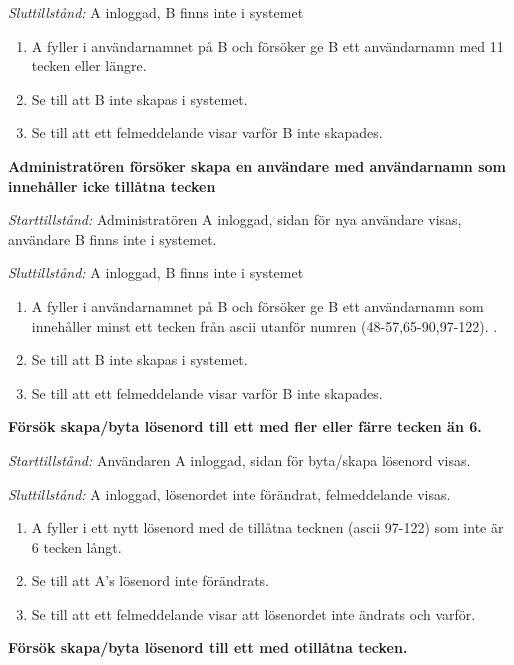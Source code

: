 \documentclass[a4paper]{article}
\begin{document}
\begin{FT}
\emph{Sluttillstånd:} A inloggad, B finns inte i systemet

\begin{enumerate}
\item A fyller i användarnamnet på B och försöker ge B ett användarnamn med 11 tecken eller längre.
\item Se till att B inte skapas i systemet.
\item Se till att ett felmeddelande visar varför B inte skapades.
\end{enumerate}

\item
\textbf{Administratören försöker skapa en användare med användarnamn som innehåller icke tillåtna tecken}

\emph{Starttillstånd:} Administratören A inloggad, sidan för nya användare visas, användare B finns inte i systemet.

\emph{Sluttillstånd:} A inloggad, B finns inte i systemet

\begin{enumerate}
\item A fyller i användarnamnet på B och försöker ge B ett användarnamn som innehåller minst ett tecken från ascii utanför numren (48-57,65-90,97-122).  .
\item Se till att B inte skapas i systemet.
\item Se till att ett felmeddelande visar varför B inte skapades.
\end{enumerate}

\item
\textbf{Försök skapa/byta lösenord till ett med fler eller färre tecken än 6.}

\emph{Starttillstånd:} Användaren A inloggad, sidan för byta/skapa lösenord visas.

\emph{Sluttillstånd:} A inloggad, lösenordet inte förändrat, felmeddelande visas.

\begin{enumerate}
\item A fyller i ett nytt lösenord med de tillåtna tecknen (ascii 97-122) som inte är 6 tecken långt.
\item Se till att A's lösenord inte förändrats.
\item Se till att ett felmeddelande visar att lösenordet inte ändrats och varför.
\end{enumerate}

\item
\textbf{Försök skapa/byta lösenord till ett med otillåtna tecken.}


\end{FT}
\end{document}
